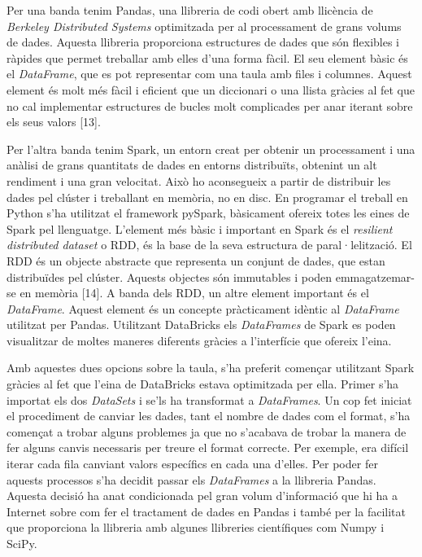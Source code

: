 \documentclass[10pt,a4paper,twocolumn,twoside]{article}
\begin{document}
Per una banda tenim Pandas, una llibreria de codi obert amb llicència de \textit{Berkeley Distributed Systems} optimitzada per al processament de grans volums de dades. Aquesta llibreria proporciona estructures de dades que són flexibles i ràpides que permet treballar amb elles d'una forma fàcil. El seu element bàsic és el \textit{DataFrame}, que es pot representar com una taula amb files i columnes. Aquest element és molt més fàcil i eficient que un diccionari o una llista gràcies al fet que no cal implementar estructures de bucles molt complicades per anar iterant sobre els seus valors [13].

Per l'altra banda tenim Spark, un entorn creat per obtenir un processament i una anàlisi de grans quantitats de dades en entorns distribuïts, obtenint un alt rendiment i una gran velocitat. Això ho aconsegueix a partir de distribuir les dades pel clúster i treballant en memòria, no en disc. En programar el treball en Python s'ha utilitzat el framework pySpark, bàsicament ofereix totes les eines de Spark pel llenguatge. L'element més bàsic i important en Spark és el \textit{resilient distributed dataset} o RDD, és la base de la seva estructura de paral·lelització. El RDD és un objecte abstracte que representa un conjunt de dades, que estan distribuïdes pel clúster. Aquests objectes són immutables i poden emmagatzemar-se en memòria [14]. A banda dels RDD, un altre element important és el \textit{DataFrame}. Aquest element és un concepte pràcticament idèntic al \textit{DataFrame} utilitzat per Pandas. Utilitzant DataBricks els \textit{DataFrames} de Spark es poden visualitzar de moltes maneres diferents gràcies a l'interfície que ofereix l'eina.

Amb aquestes dues opcions sobre la taula, s'ha preferit començar utilitzant Spark gràcies al fet que l'eina de DataBricks estava optimitzada per ella. Primer s'ha importat els dos \textit{DataSets} i se'ls ha transformat a \textit{DataFrames}. Un cop fet iniciat el procediment de canviar les dades, tant el nombre de dades com el format, s'ha començat a trobar alguns problemes ja que no s'acabava de trobar la manera de fer alguns canvis necessaris per treure el format correcte. Per exemple, era difícil iterar cada fila canviant valors específics en cada una d'elles. Per poder fer aquests processos s'ha decidit passar els \textit{DataFrames} a la llibreria Pandas. Aquesta decisió ha anat condicionada pel gran volum d'informació que hi ha a Internet sobre com fer el tractament de dades en Pandas i també per la facilitat que proporciona la llibreria amb algunes llibreries científiques com Numpy i SciPy.
\end{document}
